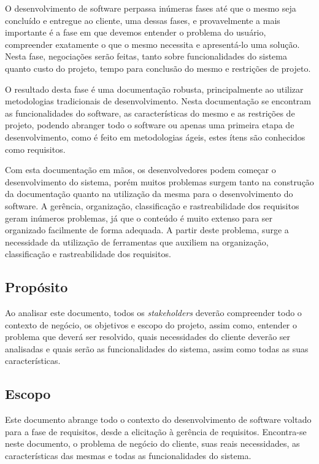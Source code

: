 
O desenvolvimento de software perpassa inúmeras fases até que o mesmo seja concluído e entregue ao cliente, uma dessas fases, e provavelmente a mais importante é a fase em que devemos entender o problema do usuário, compreender exatamente o que o mesmo necessita e apresentá-lo uma solução. Nesta fase, negociações serão feitas, tanto sobre funcionalidades do sistema quanto custo do projeto, tempo para conclusão do mesmo e restrições de projeto.

O resultado desta fase é uma documentação robusta, principalmente ao utilizar metodologias tradicionais de desenvolvimento. Nesta documentação se encontram as funcionalidades do software, as características do mesmo e as restrições de projeto, podendo abranger todo o software ou apenas uma primeira etapa de desenvolvimento, como é feito em metodologias ágeis, estes ítens são conhecidos como requisitos.

Com esta documentação em mãos, os desenvolvedores podem começar o desenvolvimento do sistema, porém muitos problemas surgem tanto na construção da documentação quanto na utilização da mesma para o desenvolvimento do software. A gerência, organização, classificação e rastreabilidade dos requisitos geram inúmeros problemas, já que o conteúdo é muito extenso para ser organizado facilmente de forma adequada. A partir deste problema, surge a necessidade da utilização de ferramentas que auxiliem na organização, classificação e rastreabilidade dos requisitos.

\subsection{Propósito}

Ao analisar este documento, todos os \textit{stakeholders} deverão compreender todo o contexto de negócio, os objetivos e escopo do projeto, assim como, entender o problema que deverá ser resolvido, quais necessidades do cliente deverão ser analisadas e quais serão as funcionalidades do sistema, assim como todas as suas características.

\subsection{Escopo}

Este documento abrange todo o contexto do desenvolvimento de software voltado para a fase de requisitos, desde a elicitação à gerência de requisitos. Encontra-se neste documento, o problema de negócio do cliente, suas reais necessidades, as características das mesmas e todas as funcionalidades do sistema.

